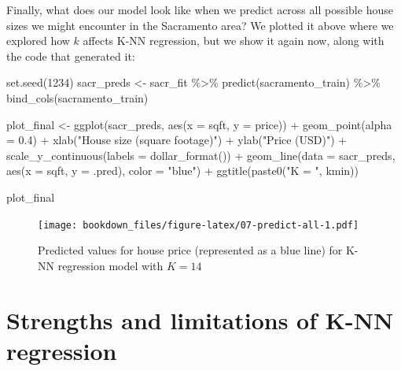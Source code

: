\documentclass[
]{krantz}
\makeatletter
\newenvironment{Shaded}{\begin{snugshade}}{\end{snugshade}}
\newcommand{\AttributeTok}[1]{\textcolor[rgb]{0.61,0.61,0.61}{#1}}
\newcommand{\DecValTok}[1]{\textcolor[rgb]{0.06,0.06,0.06}{#1}}
\newcommand{\FloatTok}[1]{\textcolor[rgb]{0.06,0.06,0.06}{#1}}
\newcommand{\FunctionTok}[1]{\textcolor[rgb]{0,0,0}{#1}}
\newcommand{\NormalTok}[1]{#1}
\newcommand{\OtherTok}[1]{\textcolor[rgb]{0.37,0.37,0.37}{#1}}
\newcommand{\SpecialCharTok}[1]{\textcolor[rgb]{0,0,0}{#1}}
\newcommand{\StringTok}[1]{\textcolor[rgb]{0.5,0.5,0.5}{#1}}
\newenvironment{kframe}{%
\medskip{}
\setlength{\fboxsep}{.8em}
 \def\at@end@of@kframe{}%
 \ifinner\ifhmode%
  \def\at@end@of@kframe{\end{minipage}}%
  \begin{minipage}{\columnwidth}%
 \fi\fi%
 \def\FrameCommand##1{\hskip\@totalleftmargin \hskip-\fboxsep
 \colorbox{shadecolor}{##1}\hskip-\fboxsep
     \hskip-\linewidth \hskip-\@totalleftmargin \hskip\columnwidth}%
 \MakeFramed {\advance\hsize-\width
   \@totalleftmargin\z@ \linewidth\hsize
   \@setminipage}}%
 {\par\unskip\endMakeFramed%
 \at@end@of@kframe}
\renewenvironment{Shaded}{\begin{kframe}}{\end{kframe}}
\makeatother
\begin{document}
Finally, what does our model look like when we predict across all possible
house sizes we might encounter in the Sacramento area? We plotted it above
where we explored how \(k\) affects K-NN regression, but we show it again now,
along with the code that generated it:

\begin{Shaded}
\begin{Highlighting}[]
\FunctionTok{set.seed}\NormalTok{(}\DecValTok{1234}\NormalTok{)}
\NormalTok{sacr\_preds }\OtherTok{\textless{}{-}}\NormalTok{ sacr\_fit }\SpecialCharTok{\%\textgreater{}\%}
  \FunctionTok{predict}\NormalTok{(sacramento\_train) }\SpecialCharTok{\%\textgreater{}\%}
  \FunctionTok{bind\_cols}\NormalTok{(sacramento\_train)}

\NormalTok{plot\_final }\OtherTok{\textless{}{-}} \FunctionTok{ggplot}\NormalTok{(sacr\_preds, }\FunctionTok{aes}\NormalTok{(}\AttributeTok{x =}\NormalTok{ sqft, }\AttributeTok{y =}\NormalTok{ price)) }\SpecialCharTok{+}
  \FunctionTok{geom\_point}\NormalTok{(}\AttributeTok{alpha =} \FloatTok{0.4}\NormalTok{) }\SpecialCharTok{+}
  \FunctionTok{xlab}\NormalTok{(}\StringTok{"House size (square footage)"}\NormalTok{) }\SpecialCharTok{+}
  \FunctionTok{ylab}\NormalTok{(}\StringTok{"Price (USD)"}\NormalTok{) }\SpecialCharTok{+}
  \FunctionTok{scale\_y\_continuous}\NormalTok{(}\AttributeTok{labels =} \FunctionTok{dollar\_format}\NormalTok{()) }\SpecialCharTok{+}
  \FunctionTok{geom\_line}\NormalTok{(}\AttributeTok{data =}\NormalTok{ sacr\_preds, }\FunctionTok{aes}\NormalTok{(}\AttributeTok{x =}\NormalTok{ sqft, }\AttributeTok{y =}\NormalTok{ .pred), }\AttributeTok{color =} \StringTok{"blue"}\NormalTok{) }\SpecialCharTok{+}
  \FunctionTok{ggtitle}\NormalTok{(}\FunctionTok{paste0}\NormalTok{(}\StringTok{"K = "}\NormalTok{, kmin))}

\NormalTok{plot\_final}
\end{Highlighting}
\end{Shaded}

\begin{figure}
\centering
\texttt{[image: bookdown\_files/figure-latex/07-predict-all-1.pdf]}
\caption{\label{fig:07-predict-all}Predicted values for house price (represented as a blue line) for K-NN regression model with \(K = 14\)}
\end{figure}

\hypertarget{strengths-and-limitations-of-k-nn-regression}{%
\section{Strengths and limitations of K-NN regression}\label{strengths-and-limitations-of-k-nn-regression}}
\end{document}

